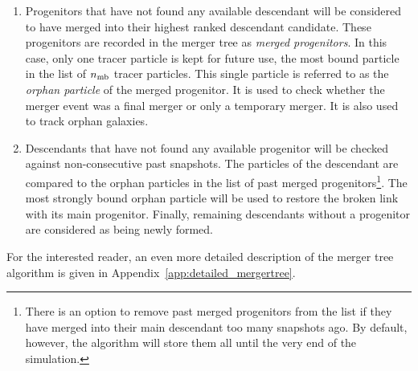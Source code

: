 \begin{enumerate}
  
\item Progenitors that have not found any available descendant will be
  considered to have merged into their highest ranked descendant
  candidate.  These progenitors are recorded in the merger tree as
  {\it merged progenitors}.  In this case, only one tracer particle is
  kept for future use, the most bound particle in the list of $n_{\rm
    mb}$ tracer particles.  This single particle is referred to as the
  \emph{orphan particle} of the merged progenitor.  It is used to
  check whether the merger event was a final merger or only a
  temporary merger. It is also used to track orphan galaxies.

\item Descendants that have not found any available progenitor will be
  checked against non-consecutive past snapshots. The particles of the
  descendant are compared to the orphan particles in the list of past
  merged progenitors\footnote{There is an option to remove past merged
  progenitors from the list if they have merged into their main
  descendant too many snapshots ago.  By default, however, the
  algorithm will store them all until the very end of the
  simulation.}.  The most strongly bound orphan particle will be used
  to restore the broken link with its main progenitor.  Finally,
  remaining descendants without a progenitor are considered as being
  newly formed.

\end{enumerate}
  
For the interested reader, an even more detailed description of the merger tree
algorithm is given in Appendix~\ref{app:detailed_mergertree}.

